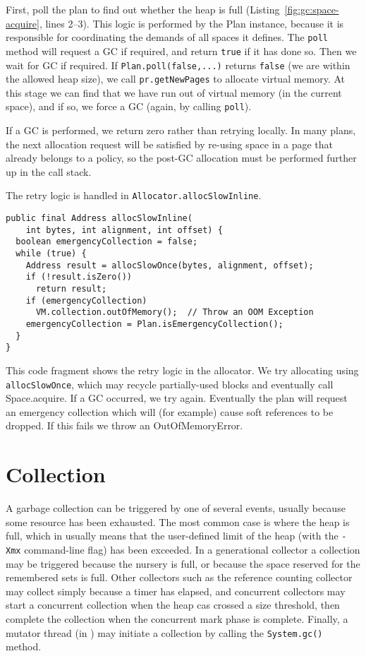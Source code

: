 First, poll the plan to find out whether the heap is full
(Listing~\ref{fig:gc:space-acquire}, lines 2--3).
This logic is performed by the Plan instance, because it is responsible for
coordinating the demands of all spaces it defines.
The \lstinline|poll| method will request a GC if required, and return
\lstinline|true| if it has done so.
Then we wait for GC if required.
If \lstinline|Plan.poll(false,...)| returns \lstinline|false| (we are within the
allowed heap size), we call \lstinline|pr.getNewPages| to allocate virtual memory.  
At this stage we can find that we have run out of virtual memory (in the
current space), and if so, we force a GC (again, by calling \lstinline|poll|).

If a GC is performed, we return zero rather than retrying locally. 
In many plans, the next allocation request will be satisfied by re-using space 
in a page that already belongs to a policy, so the post-GC allocation 
must be performed further up in the call stack.  

The retry logic is handled in \lstinline|Allocator.allocSlowInline|.
\begin{lstlisting}[name=Allocator.java, 
                   caption=\lstname: allocSlowInline,
                   label=fig:gc:freelist-allocslow]
public final Address allocSlowInline(
    int bytes, int alignment, int offset) {
  boolean emergencyCollection = false;
  while (true) {
    Address result = allocSlowOnce(bytes, alignment, offset);
    if (!result.isZero())
      return result;
    if (emergencyCollection)
      VM.collection.outOfMemory();  // Throw an OOM Exception
    emergencyCollection = Plan.isEmergencyCollection();
  }
}
\end{lstlisting}
This code fragment shows the retry logic in the allocator.  We try allocating 
using \lstinline|allocSlowOnce|, which may recycle partially-used blocks and
eventually call Space.acquire.  If a GC occurred, we try again.  Eventually the plan 
will request an emergency collection which will (for example) cause 
soft references to be dropped.  If this fails we throw an OutOfMemoryError.

\section{Collection}

A garbage collection can be triggered by one of several events, usually 
because some resource has been exhausted.  The most common case is where
the heap is full, which in \java usually means that the user-defined limit
of the heap (with the \lstinline|-Xmx| command-line flag) has been exceeded.
In a generational collector a collection may be triggered because the nursery
is full, or because the space reserved for the remembered sets is full.
Other collectors such as the reference counting collector may collect simply
because a timer has elapsed, and concurrent collectors may start a concurrent
collection when the heap cas crossed a size threshold, then complete the
collection when the concurrent mark phase is complete.  Finally, a mutator
thread (in \java) may initiate a collection by calling the
\lstinline|System.gc()| method.


